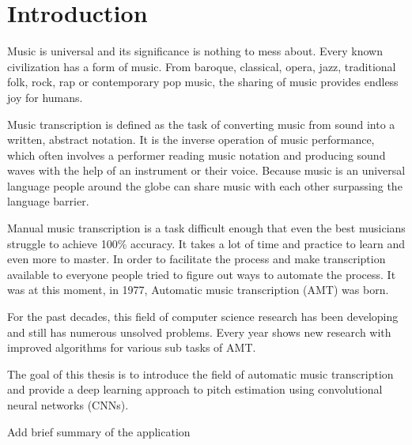 \newpage
\section{Introduction}
Music is universal and its significance is nothing to mess about. Every known civilization has a form of music. From baroque, classical, opera, jazz, traditional folk, rock, rap or contemporary pop music, the sharing of music provides endless joy for humans.
\par
Music transcription is defined as the task of converting music from sound into a written, abstract notation.
It is the inverse operation of music performance, which often involves a performer reading music notation and producing sound waves with the help of an instrument or their voice. Because music is an universal language people around the globe can share music with each other surpassing the language barrier.
\par
Manual music transcription is a task difficult enough that even the best musicians struggle to achieve 100\% accuracy. It takes a lot of time and practice to learn and even more to master. In order to facilitate the process and make transcription available to everyone people tried to figure out ways to automate the process. It was at this moment, in 1977, Automatic music transcription (AMT) was born.
\par
For the past decades, this field of computer science research has been developing and still has numerous unsolved problems. Every year shows new research with improved algorithms for various sub tasks of AMT.
\par
The goal of this thesis is to introduce the field of automatic music transcription and provide a deep learning approach to pitch estimation using convolutional neural networks (CNNs).

\par
Add brief summary of the application